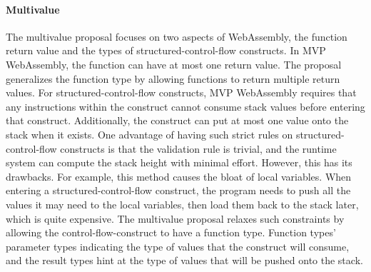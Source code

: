 \paragraph{Multivalue}
The multivalue proposal focuses on two aspects of WebAssembly, the function
return value and the types of structured-control-flow constructs. In MVP
WebAssembly, the function can have at most one return value. The proposal
generalizes the function type by allowing functions to return multiple return
values. For structured-control-flow constructs, MVP WebAssembly requires that
any instructions within the construct cannot consume stack values before
entering that construct. Additionally, the construct can put at most one value
onto the stack when it exists. One advantage of having such strict rules on
structured-control-flow constructs is that the validation rule is trivial, and
the runtime system can compute the stack height with minimal effort. However,
this has its drawbacks. For example, this method causes the bloat of local
variables. When entering a structured-control-flow construct, the program needs
to push all the values it may need to the local variables, then load them back
to the stack later, which is quite expensive. The multivalue proposal relaxes
such constraints by allowing the control-flow-construct to have a function type.
Function types' parameter types indicating the type of values that the construct
will consume, and the result types hint at the type of values that will be
pushed onto the stack.

